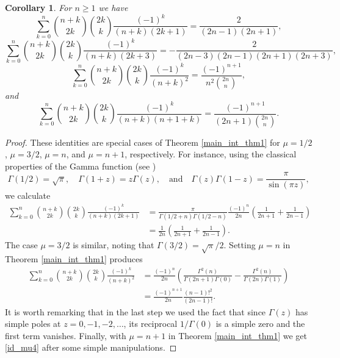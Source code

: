 \documentclass[11pt,reqno]{amsart}
\theoremstyle{plain}
\numberwithin{equation}{section}
\newtheorem{corollary}[thm]{Corollary}
\begin{document}
\begin{corollary}\label{cor_int}
For $n\geq 1$ we have
\begin{equation}\label{id_mu1}
\sum_{k=0}^{n} \binom{n+k}{2k} \binom{2k}{k} \frac{(-1)^k}{(n+k)(2k+1)} = \frac{2}{(2n-1)(2n+1)},
\end{equation}
\begin{equation}\label{id_mu2}
\sum_{k=0}^{n} \binom{n+k}{2k} \binom{2k}{k} \frac{(-1)^k}{(n+k)(2k+3)} = - \frac{2}{(2n-3)(2n-1)(2n+1)(2n+3)},
\end{equation}
\begin{equation}\label{id_mu3}
\sum_{k=0}^{n} \binom{n+k}{2k} \binom{2k}{k} \frac{(-1)^k}{(n+k)^2} = \frac{(-1)^{n+1}}{n^2 \binom{2n}{n}},
\end{equation}
and
\begin{equation}\label{id_mu4}
\sum_{k=0}^{n} \binom{n+k}{2k} \binom{2k}{k} \frac{(-1)^k}{(n+k)(n+1+k)} = \frac{(-1)^{n+1}}{(2n+1) \binom{2n}{n}}.
\end{equation}
\end{corollary}
\begin{proof}
These identities are special cases of Theorem \ref{main_int_thm1} for $\mu=1/2$, $\mu=3/2$, $\mu=n$, and $\mu=n+1$, respectively.
For instance, using the classical properties of the Gamma function (see \cite{Srivastava})
$$\Gamma(1/2)=\sqrt{\pi}, \quad \Gamma(1+z)=z\Gamma(z),\quad \text{and}\quad \Gamma(z)\Gamma(1-z)=\frac{\pi}{\sin(\pi z)},$$
we calculate
\begin{align*}
\sum_{k=0}^{n} \binom{n+k}{2k} \binom{2k}{k} \frac{(-1)^k}{(n+k)(2k+1)} &= \frac{\pi}{\Gamma(1/2+n)\Gamma(1/2-n)}\frac{(-1)^n}{2n}\left (\frac{1}{2n+1}+\frac{1}{2n-1}\right ) \\
&= \frac{1}{2n}\left (\frac{1}{2n+1}+\frac{1}{2n-1}\right ).
\end{align*}
The case $\mu=3/2$ is similar, noting that $\Gamma(3/2)=\sqrt{\pi}/2$. Setting $\mu=n$ in Theorem \ref{main_int_thm1} produces
\begin{align*}
\sum_{k=0}^{n} \binom{n+k}{2k} \binom{2k}{k} \frac{(-1)^k}{(n+k)^2} 
&= \frac{(-1)^n}{2n} \left (\frac{\Gamma^2(n)}{\Gamma(2n+1)\Gamma(0)} - \frac{\Gamma^2(n)}{\Gamma(2n)\Gamma(1)} \right ) \\
&= \frac{(-1)^{n+1}}{2n} \frac{(n-1)!^2}{(2n-1)!}.
\end{align*}
It is worth remarking that in the last step we used the fact that since $\Gamma(z)$ has simple poles at $z=0,-1,-2,\ldots$, 
its reciprocal $1/\Gamma(0)$ is a simple zero and the first term vanishes. Finally, with $\mu=n+1$ in Theorem \ref{main_int_thm1} we get 
\eqref{id_mu4} after some simple manipulations.
\end{proof}
\end{document}
